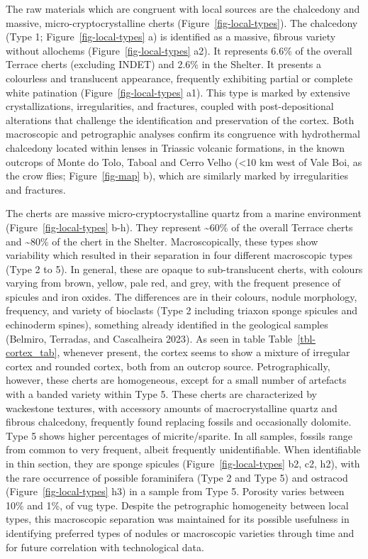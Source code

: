 \documentclass[
  a4paper,
  DIV=11,
  numbers=noendperiod]{scrreprt}
\begin{document}
The raw materials which are congruent with local sources are the
chalcedony and massive, micro-cryptocrystalline cherts
(Figure~\ref{fig-local-types}). The chalcedony (Type 1;
Figure~\ref{fig-local-types} a) is identified as a massive, fibrous
variety without allochems (Figure~\ref{fig-local-types} a2). It
represents 6.6\% of the overall Terrace cherts (excluding INDET) and
2.6\% in the Shelter. It presents a colourless and translucent
appearance, frequently exhibiting partial or complete white patination
(Figure~\ref{fig-local-types} a1). This type is marked by extensive
crystallizations, irregularities, and fractures, coupled with
post-depositional alterations that challenge the identification and
preservation of the cortex. Both macroscopic and petrographic analyses
confirm its congruence with hydrothermal chalcedony located within
lenses in Triassic volcanic formations, in the known outcrops of Monte
do Tolo, Taboal and Cerro Velho (\textless10 km west of Vale Boi, as the
crow flies; Figure~\ref{fig-map} b), which are similarly marked by
irregularities and fractures.

The cherts are massive micro-cryptocrystalline quartz from a marine
environment (Figure~\ref{fig-local-types} b-h). They represent
\textasciitilde60\% of the overall Terrace cherts and
\textasciitilde80\% of the chert in the Shelter. Macroscopically, these
types show variability which resulted in their separation in four
different macroscopic types (Type 2 to 5). In general, these are opaque
to sub-translucent cherts, with colours varying from brown, yellow, pale
red, and grey, with the frequent presence of spicules and iron oxides.
The differences are in their colours, nodule morphology, frequency, and
variety of bioclasts (Type 2 including triaxon sponge spicules and
echinoderm spines), something already identified in the geological
samples (Belmiro, Terradas, and Cascalheira 2023). As seen in table
Table~\ref{tbl-cortex_tab}, whenever present, the cortex seems to show a
mixture of irregular cortex and rounded cortex, both from an outcrop
source. Petrographically, however, these cherts are homogeneous, except
for a small number of artefacts with a banded variety within Type 5.
These cherts are characterized by wackestone textures, with accessory
amounts of macrocrystalline quartz and fibrous chalcedony, frequently
found replacing fossils and occasionally dolomite. Type 5 shows higher
percentages of micrite/sparite. In all samples, fossils range from
common to very frequent, albeit frequently unidentifiable. When
identifiable in thin section, they are sponge spicules
(Figure~\ref{fig-local-types} b2, c2, h2), with the rare occurrence of
possible foraminifera (Type 2 and Type 5) and ostracod
(Figure~\ref{fig-local-types} h3) in a sample from Type 5. Porosity
varies between 10\% and 1\%, of vug type. Despite the petrographic
homogeneity between local types, this macroscopic separation was
maintained for its possible usefulness in identifying preferred types of
nodules or macroscopic varieties through time and for future correlation
with technological data.
\end{document}
